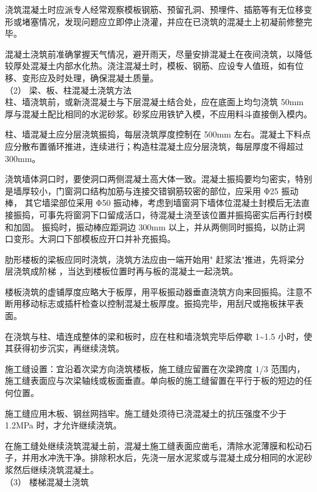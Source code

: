  浇筑混凝土时应派专人经常观察模板钢筋、预留孔洞、预埋件、插筋等有无位移变形或堵塞情况，发现问题应立即停止浇灌，并应在已浇筑的混凝土上初凝前修整完毕。

 混凝土浇筑前准确掌握天气情况，避开雨天，尽量安排混凝土在夜间浇筑，以降低较厚处混凝土内部水化热。浇注混凝土时，模板、钢筋、应设专人值班，如有位移、变形应及时处理，确保混凝土质量。\\

（2） 梁、板、柱混凝土浇筑方法\\

 柱、墙浇筑前，或新浇混凝土与下层混凝土结合处，应在底面上均匀浇筑 50mm 厚与混凝土配比相同的水泥砂浆。砂浆应用铁铲入模，不应用料斗直接倒入模内。

 柱、墙混凝土应分层浇筑振捣，每层浇筑厚度控制在 500mm 左右。混凝土下料点应分散布置循环推进，连续进行；构造柱混凝土应分层浇筑，每层厚度不得超过 300mm。

 浇筑墙体洞口时，要使洞口两侧混凝土高大体一致。混凝土振捣要均匀密实，特别是墙厚较小，门窗洞口结构加筋与连接交错钢筋较密的部位，应采用 Φ25 振动棒，
其它墙梁部位采用 Φ50 振动棒，考虑到墙窗洞下墙体位混凝土封模后无法直接振捣，可事先将窗洞下口留成活口，待混凝土浇至该位置并振捣密实后再行封模和加固。
振捣时，振动棒应距洞边 300mm 以上，并从两侧同时振捣，以防止洞口变形。大洞口下部模板应开口并补充振捣。

 肋形楼板的梁板应同时浇筑，浇筑方法应由一端开始用" 赶浆法"推进，先将梁分层浇筑成阶梯 ，当达到楼板位置时再与板的混凝土一起浇筑。

 楼板浇筑的虚铺厚度应略大于板厚，用平板振动器垂直浇筑方向来回振捣。注意不断用移动标志或插杆检查以控制混凝土板厚度。振捣完毕，用刮尺或拖板抹平表面。

 在浇筑与柱、墙连成整体的梁和板时，应在柱和墙浇筑完毕后停歇 1\textasciitilde1.5 小时，使其获得初步沉实，再继续浇筑。

 施工缝设置：宜沿着次梁方向浇筑楼板，施工缝应留置在次梁跨度 1/3 范围内，施工缝表面应与次梁轴线或板面垂直。单向板的施工缝留置在平行于板的短边的任何位置。

 施工缝应用木板、钢丝网挡牢。施工缝处须待已浇混凝土的抗压强度不少于 1.2MPa 时，才允许继续浇筑。

 在施工缝处继续浇筑混凝土前，混凝土施工缝表面应凿毛，清除水泥薄膜和松动石子，并用水冲洗干净。排除积水后，先浇一层水泥浆或与混凝土成分相同的水泥砂浆然后继续浇筑混凝土。\\

（3） 楼梯混凝土浇筑\\

